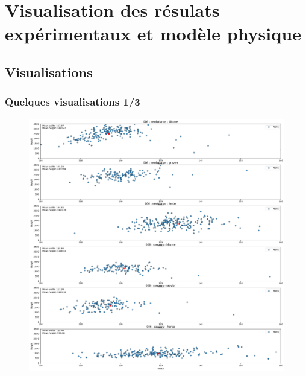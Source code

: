 \section{Visualisation des résulats expérimentaux et modèle physique}
\subsection{Visualisations}
\begin{frame}
    \frametitle{Quelques visualisations 1/3}
    \begin{figure}[!h]
        \includegraphics[scale=0.2]{./figures/res_02.png}
    \end{figure}
\end{frame}
